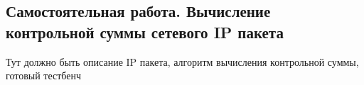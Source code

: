 \subsection{Самостоятельная работа. Вычисление контрольной суммы сетевого IP пакета}

Тут должно быть описание IP пакета, алгоритм вычисления контрольной суммы, готовый тестбенч